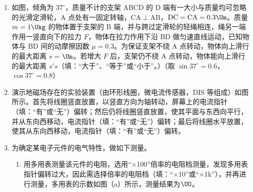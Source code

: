 \documentclass[\gkver]{gaokaozhenti}
\begin{document}
\begin{enumerate}
\item
如图，倾角为 $37^\circ$，质量不计的支架 ABCD 的 D 端有一大小与质量均可忽略的光滑定滑轮，A 点处有一固定转轴，$\mathrm{CA}\perp\mathrm{AB}$，$\mathrm{DC}=\mathrm{CA}=0.3\Um$。质量 $m = 1\Ukg$ 的物体置于支架的 B 端，并与跨过定滑轮的轻绳相连，绳另一端作用一竖直向下的拉力 $F$，物体在拉力作用下沿 BD 做匀速直线运动，已知物体与 BD 间的动摩擦因数 $\mu = 0.3$。为保证支架不绕 A 点转动，物体向上滑行的最大距离 $s =$$\Um$。若增大 $F$ 后，支架仍不绕 A 点转动，物体能向上滑行的最大距离 $s'$$s$（填：“大于”、“等于”或“小于”。）（取 $\sin37^\circ = 0.6$，$\cos37^\circ = 0.8$）
\onepicture[align=right, w=4.61cm]{}

\item
演示地磁场存在的实验装置（由环形线圈，微电流传感器，DIS 等组成）如图所示。首先将线圈竖直放置，以竖直方向为轴转动，屏幕上的电流指针（填：“有”或“无”）偏转；然后仍将线圈竖直放置，使其平面与东西向平行，并从东向西移动，电流指针（填：“有”或“无”）偏转；最后将线圈水平放置，使其从东向西移动，电流指针（填：“有”或“无”）偏转。

\item
为确定某电子元件的电气特性，做如下测量。
\begin{enumerate}
	\item
	用多用表测量该元件的电阻，选用“$\times$100”倍率的电阻档测量，发现多用表指针偏转过大，因此需选择倍率的电阻档（填：“$\times$10”或“$\times$1k”），并再进行测量，多用表的示数如图（a）所示，测量结果为$\UO$。


\end{enumerate}
\end{enumerate}
\end{document}
